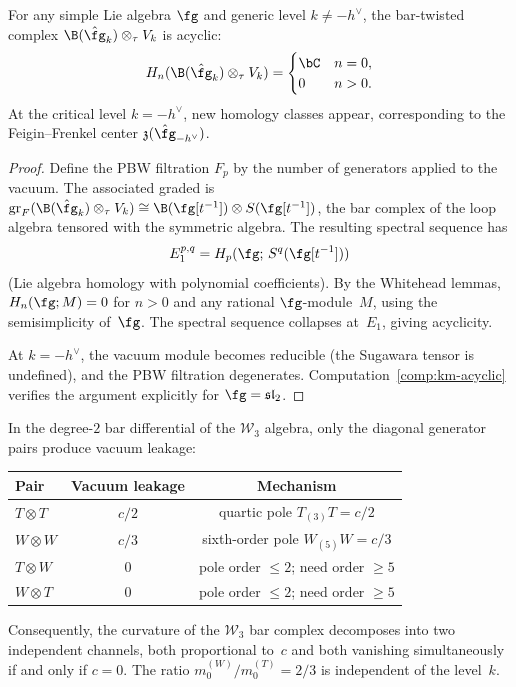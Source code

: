 \begin{proposition}
\label{prop:km-generic-acyclicity}
For any simple Lie algebra $\fg$ and generic level $k \neq -h^\vee$,
the bar-twisted complex $\B(\hat{\fg}_k) \otimes_\tau V_k$ is acyclic:
\[
H_n(\B(\hat{\fg}_k) \otimes_\tau V_k) = \begin{cases}
\bC & n = 0, \\
0 & n > 0.
\end{cases}
\]
At the critical level $k = -h^\vee$, new homology classes appear,
corresponding to the Feigin--Frenkel center $\mathfrak{z}(\hat{\fg}_{-h^\vee})$.
\end{proposition}

\begin{proof}
Define the PBW filtration $F_p$ by the number of generators applied
to the vacuum.  The associated graded is
$\mathrm{gr}_F(\B(\hat{\fg}_k) \otimes_\tau V_k) \cong
\B(\fg[t^{-1}]) \otimes S(\fg[t^{-1}])$,
the bar complex of the loop algebra tensored with the symmetric algebra.
The resulting spectral sequence has
\[
E_1^{p,q} = H_p(\fg;\, S^q(\fg[t^{-1}]))
\]
(Lie algebra homology with polynomial coefficients).
By the Whitehead lemmas, $H_n(\fg; M) = 0$ for $n > 0$ and any
rational $\fg$-module~$M$, using the semisimplicity of~$\fg$.
The spectral sequence collapses at~$E_1$, giving acyclicity.

At $k = -h^\vee$, the vacuum module becomes reducible (the Sugawara
tensor is undefined), and the PBW filtration degenerates.
Computation~\ref{comp:km-acyclic} verifies the argument explicitly
for $\fg = \mathfrak{sl}_2$.
\end{proof}


\begin{proposition}
\label{prop:w3-vacuum-dichotomy}
In the degree-$2$ bar differential of the $\mathcal{W}_3$ algebra,
only the diagonal generator pairs produce vacuum leakage:
\begin{center}
\renewcommand{\arraystretch}{1.2}
\begin{tabular}{lcc}
\textbf{Pair} & \textbf{Vacuum leakage} & \textbf{Mechanism} \\
\hline
$T \otimes T$ & $c/2$ & quartic pole $T_{(3)}T = c/2$ \\
$W \otimes W$ & $c/3$ & sixth-order pole $W_{(5)}W = c/3$ \\
$T \otimes W$ & $0$ & pole order $\leq 2$; need order $\geq 5$ \\
$W \otimes T$ & $0$ & pole order $\leq 2$; need order $\geq 5$
\end{tabular}
\end{center}
Consequently, the curvature of the $\mathcal{W}_3$ bar complex decomposes
into two independent channels, both proportional to~$c$ and both vanishing
simultaneously if and only if $c = 0$.
The ratio $m_0^{(W)}/m_0^{(T)} = 2/3$ is independent of the level~$k$.
\end{proposition}

